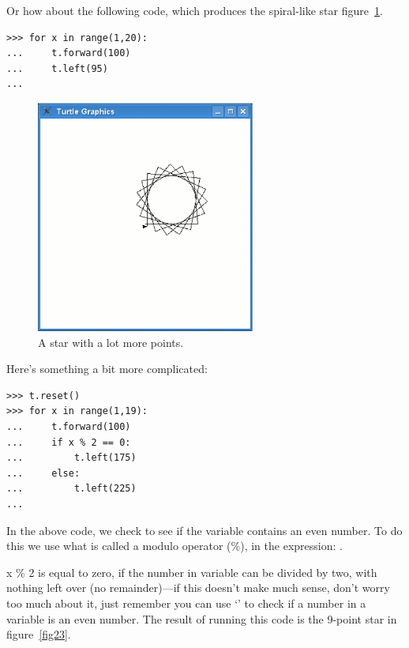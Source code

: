 \noindent
Or how about the following code, which produces the spiral-like star figure~\ref{fig22}.

\begin{listing}
\begin{verbatim}
>>> for x in range(1,20):
...     t.forward(100)
...     t.left(95)
...
\end{verbatim}
\end{listing}

\begin{figure}
\begin{center}
\includegraphics[width=72mm]{eps/figure22.eps}
\end{center}
\caption{A star with a lot more points.}\label{fig22}
\end{figure}

\noindent
Here's something a bit more complicated:

\begin{listing}
\begin{verbatim}
>>> t.reset()
>>> for x in range(1,19):
...     t.forward(100)
...     if x % 2 == 0:
...         t.left(175)
...     else:
...         t.left(225)
...
\end{verbatim}
\end{listing}

In the above code, we check to see if the variable  contains an even number.  To do this we use what is called a modulo operator (\%), in the expression: .
\par
x \% 2 is equal to zero, if the number in variable  can be divided by two, with nothing left over (no remainder)---if this doesn't make much sense, don't worry too much about it, just remember you can use `' to check if a number in a variable is an even number.  The result of running this code is the 9-point star in figure~\ref{fig23}.

